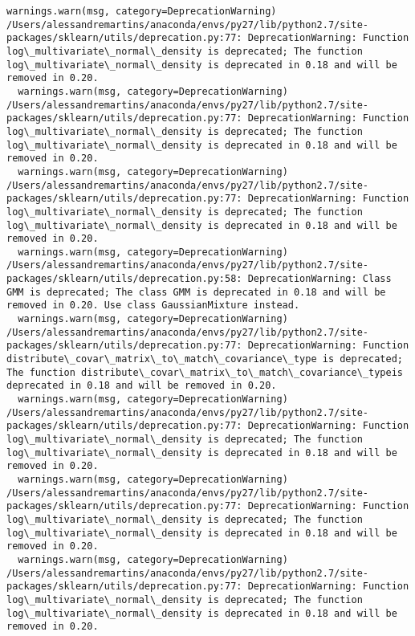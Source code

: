 \documentclass[11pt]{article}
\begin{document}
\begin{Verbatim}[commandchars=\\\{\}]
  warnings.warn(msg, category=DeprecationWarning)
/Users/alessandremartins/anaconda/envs/py27/lib/python2.7/site-packages/sklearn/utils/deprecation.py:77: DeprecationWarning: Function log\_multivariate\_normal\_density is deprecated; The function log\_multivariate\_normal\_density is deprecated in 0.18 and will be removed in 0.20.
  warnings.warn(msg, category=DeprecationWarning)
/Users/alessandremartins/anaconda/envs/py27/lib/python2.7/site-packages/sklearn/utils/deprecation.py:77: DeprecationWarning: Function log\_multivariate\_normal\_density is deprecated; The function log\_multivariate\_normal\_density is deprecated in 0.18 and will be removed in 0.20.
  warnings.warn(msg, category=DeprecationWarning)
/Users/alessandremartins/anaconda/envs/py27/lib/python2.7/site-packages/sklearn/utils/deprecation.py:77: DeprecationWarning: Function log\_multivariate\_normal\_density is deprecated; The function log\_multivariate\_normal\_density is deprecated in 0.18 and will be removed in 0.20.
  warnings.warn(msg, category=DeprecationWarning)
/Users/alessandremartins/anaconda/envs/py27/lib/python2.7/site-packages/sklearn/utils/deprecation.py:58: DeprecationWarning: Class GMM is deprecated; The class GMM is deprecated in 0.18 and will be  removed in 0.20. Use class GaussianMixture instead.
  warnings.warn(msg, category=DeprecationWarning)
/Users/alessandremartins/anaconda/envs/py27/lib/python2.7/site-packages/sklearn/utils/deprecation.py:77: DeprecationWarning: Function distribute\_covar\_matrix\_to\_match\_covariance\_type is deprecated; The function distribute\_covar\_matrix\_to\_match\_covariance\_typeis deprecated in 0.18 and will be removed in 0.20.
  warnings.warn(msg, category=DeprecationWarning)
/Users/alessandremartins/anaconda/envs/py27/lib/python2.7/site-packages/sklearn/utils/deprecation.py:77: DeprecationWarning: Function log\_multivariate\_normal\_density is deprecated; The function log\_multivariate\_normal\_density is deprecated in 0.18 and will be removed in 0.20.
  warnings.warn(msg, category=DeprecationWarning)
/Users/alessandremartins/anaconda/envs/py27/lib/python2.7/site-packages/sklearn/utils/deprecation.py:77: DeprecationWarning: Function log\_multivariate\_normal\_density is deprecated; The function log\_multivariate\_normal\_density is deprecated in 0.18 and will be removed in 0.20.
  warnings.warn(msg, category=DeprecationWarning)
/Users/alessandremartins/anaconda/envs/py27/lib/python2.7/site-packages/sklearn/utils/deprecation.py:77: DeprecationWarning: Function log\_multivariate\_normal\_density is deprecated; The function log\_multivariate\_normal\_density is deprecated in 0.18 and will be removed in 0.20.

\end{Verbatim}
\end{document}
